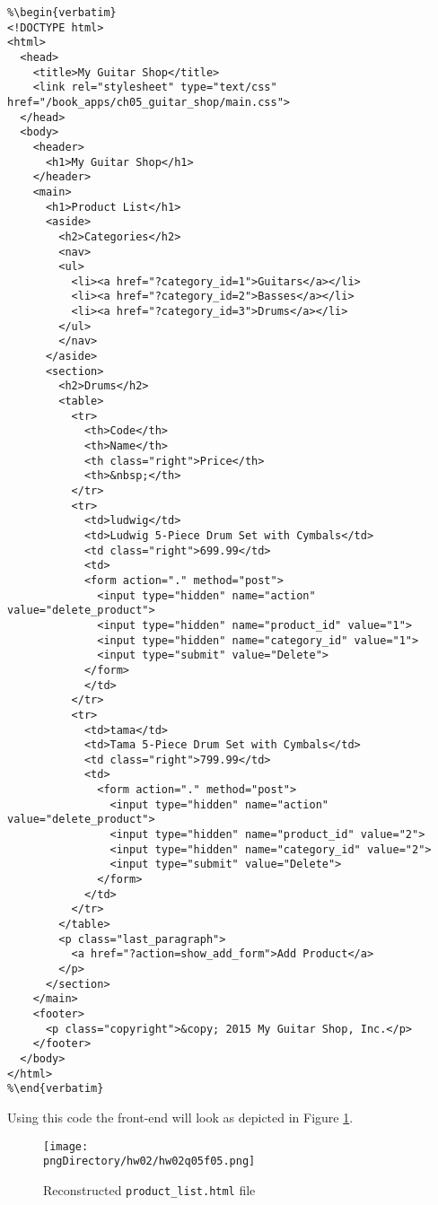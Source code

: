 \begin{lstlisting}
%\begin{verbatim}
<!DOCTYPE html>
<html>
  <head>
    <title>My Guitar Shop</title>
    <link rel="stylesheet" type="text/css" href="/book_apps/ch05_guitar_shop/main.css">
  </head>
  <body>
    <header>
      <h1>My Guitar Shop</h1>
    </header>
    <main>
      <h1>Product List</h1>
      <aside>
        <h2>Categories</h2>
        <nav>
        <ul>
          <li><a href="?category_id=1">Guitars</a></li>
          <li><a href="?category_id=2">Basses</a></li>
          <li><a href="?category_id=3">Drums</a></li>
        </ul>
        </nav>
      </aside>
      <section>
        <h2>Drums</h2>
        <table>
          <tr>
            <th>Code</th>
            <th>Name</th>
            <th class="right">Price</th>
            <th>&nbsp;</th>
          </tr>
          <tr>
            <td>ludwig</td>
            <td>Ludwig 5-Piece Drum Set with Cymbals</td>
            <td class="right">699.99</td>
            <td>
            <form action="." method="post">
              <input type="hidden" name="action" value="delete_product">
              <input type="hidden" name="product_id" value="1">
              <input type="hidden" name="category_id" value="1">
              <input type="submit" value="Delete">
            </form>
            </td>
          </tr>
          <tr>
            <td>tama</td>
            <td>Tama 5-Piece Drum Set with Cymbals</td>
            <td class="right">799.99</td>
            <td>
              <form action="." method="post">
                <input type="hidden" name="action" value="delete_product">
                <input type="hidden" name="product_id" value="2">
                <input type="hidden" name="category_id" value="2">
                <input type="submit" value="Delete">
              </form>
            </td>
          </tr>
        </table>
        <p class="last_paragraph">
          <a href="?action=show_add_form">Add Product</a>
        </p>
      </section>
    </main>
    <footer>
      <p class="copyright">&copy; 2015 My Guitar Shop, Inc.</p>
    </footer>
  </body>
</html>
%\end{verbatim}
\end{lstlisting}

Using this code the front-end will look as depicted in Figure \ref{fig5}.

\begin{figure}[H]\centering
\texttt{[image: \\pngDirectory/hw02/hw02q05f05.png]}
\caption{Reconstructed \texttt{product\_list.html} file}
\label{fig5}
\end{figure}


